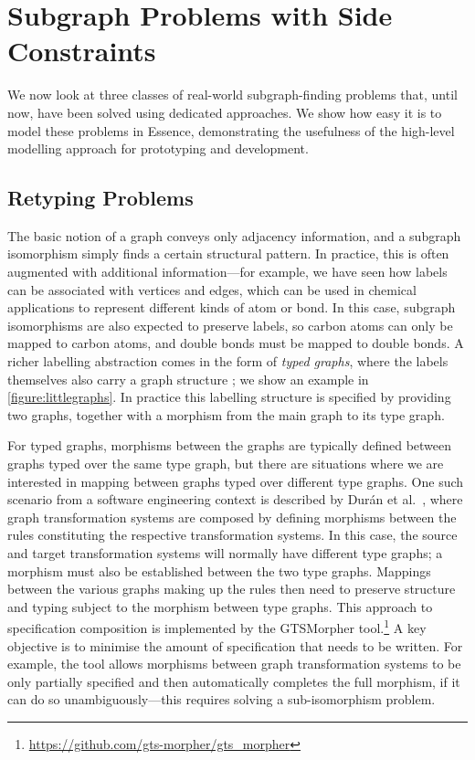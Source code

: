 \documentclass[runningheads]{llncs}
\begin{document}
\section{Subgraph Problems with Side Constraints}\label{section:problems}

We now look at three classes of real-world subgraph-finding problems that, until now, have been
solved using dedicated approaches. We show how easy it is to model these problems in Essence,
demonstrating the usefulness of the high-level modelling approach for prototyping and development.

\subsection{Retyping Problems}\label{section:typegraphs}

The basic notion of a graph conveys only adjacency information, and a subgraph isomorphism simply
finds a certain structural pattern. In practice, this is often augmented with additional
information---for example, we have seen how labels can be associated with vertices and edges, which
can be used in chemical applications to represent different kinds of atom or bond. In this case,
subgraph isomorphisms are also expected to preserve labels, so carbon atoms can only be mapped to
carbon atoms, and double bonds must be mapped to double bonds.  A richer labelling abstraction comes
in the form of \emph{typed graphs}, where the labels themselves also carry a graph structure
\cite{Ehrig+06}; we show an example in \cref{figure:littlegraphs}. In practice this labelling
structure is specified by providing two graphs, together with a morphism from the main graph to its
type graph.

For typed graphs, morphisms between the graphs are typically defined between graphs typed over the
same type graph, but there are situations where we are interested in mapping between graphs typed
over different type graphs.  One such scenario from a software engineering context is described by
Dur{\'a}n et al.~\cite{Duran+12,Duran+17}, where graph transformation systems are composed by
defining morphisms between the rules constituting the respective transformation systems.  In this
case, the source and target transformation systems will normally have different type graphs; a
morphism must also be established between the two type graphs.  Mappings between the various graphs
making up the rules then need to preserve structure and typing subject to the morphism between type
graphs. This approach to specification composition is implemented by the GTSMorpher
tool.\footnote{\url{https://github.com/gts-morpher/gts_morpher}} A key objective is to minimise the
amount of specification that needs to be written.  For example, the tool allows morphisms between
graph transformation systems to be only partially specified and then automatically completes the
full morphism, if it can do so unambiguously---this requires solving a sub-isomorphism problem.
\end{document}

